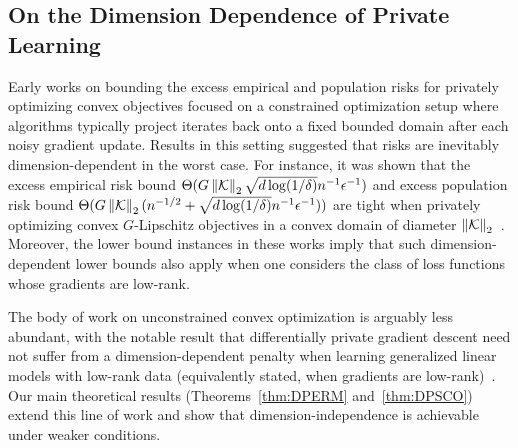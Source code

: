 \subsection{On the Dimension Dependence of Private Learning}
Early works on bounding the excess empirical and population risks for privately optimizing convex objectives focused on a constrained optimization setup where algorithms typically project iterates back onto a fixed bounded domain after each noisy gradient update. 
Results in this setting suggested that risks are inevitably dimension-dependent in the worst case.
For instance, it was shown that the excess empirical risk bound $\Theta (  G \left\lVert\mathcal K\right\rVert_2 \sqrt{d\log(1/\delta)} n^{-1} \epsilon^{-1} )$ and excess population risk bound $\Theta ( G \left\lVert\mathcal K\right\rVert_2 ( n^{-1/2} + \sqrt {d \log(1/\delta) } n^{-1} \epsilon^{-1} ) )$ are tight when privately optimizing convex $G$-Lipschitz objectives in a convex domain of diameter $\left\lVert\mathcal K\right\rVert_2$~\citep{bassily2014private}.
Moreover, the lower bound instances in these works imply that such dimension-dependent lower bounds also apply when one considers the class of loss functions whose gradients are low-rank.

The body of work on unconstrained convex optimization is arguably less abundant, with the notable result that differentially private gradient descent need not suffer from a dimension-dependent penalty when learning generalized linear models with low-rank data (equivalently stated, when gradients are low-rank)~\citep{song2021evading}.
Our main theoretical results (Theorems~\ref{thm:DPERM} and~\ref{thm:DPSCO}) extend this line of work and show that dimension-independence is achievable under weaker conditions.


